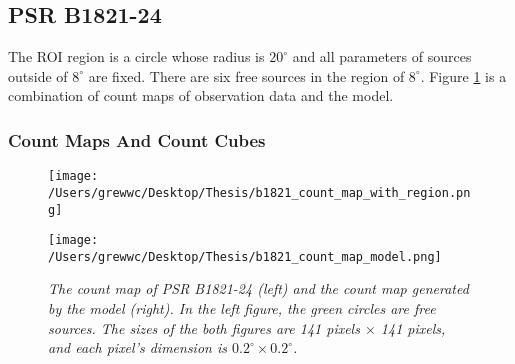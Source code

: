 \documentclass[12pt]{report}
\newcommand{\mycaption}[1]{\caption{\textit{\footnotesize #1}}}
\newcommand{\singleFig}[3]{
 \begin{figure}[!ht]
  \centering
  \texttt{[image: /Users/grewwc/Desktop/Thesis/\#1]}
  \mycaption{#3}
 \label{fig: #1}
 \end{figure}
}
\newcommand{\Notice}[1]{
  $<$\textbf{Notice}$>$#1$<$\textbf{/Notice}$>$
}
\begin{document}

            \subsection{PSR B1821-24}
              The ROI region is a circle whose radius is $20^\circ$ and all 
              parameters of sources outside of $8^\circ$ are fixed. 
              There are six free sources in the region of $8^\circ$. Figure
              \ref{fig: b1821_count_map_with_region_and_model} 
              is a combination of count maps of observation data and the model. 

              \subsubsection{Count Maps And Count Cubes}
                \begin{figure}[!ht]
                  \begin{center}
                  \begin{minipage}{0.45\textwidth}
                    \begin{center} 
                      \texttt{[image: /Users/grewwc/Desktop/Thesis/b1821\_count\_map\_with\_region.png]}
                    \end{center}
                  \end{minipage}
                  \begin{minipage}{0.45\textwidth}
                    \begin{center}
                      \texttt{[image: /Users/grewwc/Desktop/Thesis/b1821\_count\_map\_model.png]}
                    \end{center}
                  \end{minipage}
                \end{center}
                \mycaption{The count map of PSR B1821-24 (left) and the count map generated by the 
                model (right). In the left figure, the green circles are free sources. The sizes of the both 
                figures are 141 pixels $\times$ 141 pixels, and each pixel's dimension is 
                $0.2^\circ \times 0.2^\circ$.}
                \label{fig: b1821_count_map_with_region_and_model}
              \end{figure}
            
\end{document}
